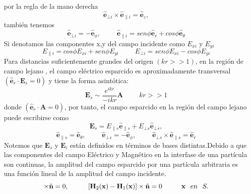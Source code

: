 \documentclass[graybox]{svmult}
\begin{document}
por la regla de la mano derecha
\begin{equation*}
\hat{\textbf{e}}_{\bot i} \times \hat{\textbf{e}}_{\parallel i}=\hat{\textbf{e}}_{z},
\end{equation*}
también tenemos
\begin{equation*}
\hat{\textbf{e}}_{\bot i}=-\hat{\textbf{e}}_{\phi}, \hspace{1cm} \hat{\textbf{e}}_{\parallel i}=sen\phi \hat{\textbf{e}}_{r}+cos\phi \hat{\textbf{e}}_{\theta}
\end{equation*}
Si denotamos las componentes x,y del campo incidente como $E_{xi}$ y $E_{yi}$
\begin{equation*}
E_{\parallel i}=cos\phi E_{xi}+sen\phi E_{yi} \hspace{1cm} E_{\bot i}=sen\phi E_{xi}-cos\phi E_{yi}
\end{equation*}
Para distancias suficientemente grandes del origen $(kr>>1)$, en la región de campo lejano , el campo eléctrico esparcido es aproximadamente transversal $(\hat{\textbf{e}}_{r} \cdot \textbf{E}_{s}=0)$ y tiene la forma asintótica:
\begin{equation*}
\textbf{E}_{s} \sim \frac{e^{ikr}}{-ikr} \textbf{A} \hspace{1cm} kr>>1
\end{equation*}
donde $(\hat{\textbf{e}}_{r} \cdot \textbf{A}=0)$, por tanto, el campo esparcido en la región del campo lejano puede escribirse como
\begin{equation*}
\textbf{E}_{s}=E_{\parallel s}\hat{\textbf{e}}_{\parallel s}+E_{\bot s}\hat{\textbf{e}}_{\bot s},
\end{equation*}
\begin{equation*}
\hat{\textbf{e}}_{\parallel s}=\hat{\textbf{e}}_{\theta}, \hspace{1cm} \hat{\textbf{e}}_{\bot s}=-\hat{\textbf{e}}_{\phi}, \hspace{1cm} \hat{\textbf{e}}_{\bot s} \times \hat{\textbf{e}}_{\parallel s}=\hat{\textbf{e}}_{r}
\end{equation*}
Notemos que $\textbf{E}_{s}$ y $\textbf{E}_{i}$ están definidos en términos de bases distintas.Debido a que las componentes del campo Eléctrico y Magnético en la interfase de una partícula son continuas, la amplitud del campo esparcido por una partícula arbitraria es una función lineal de la amplitud del campo incidente.
\begin{equation*}
[\textbf{E}_{2}(\textbf{x})-\textbf{E}_{1}(\textbf{x})]\times\hat{\textbf{n}}=0, \hspace{1cm} [\textbf{H}_{2}(\textbf{x})-\textbf{H}_{1}(\textbf{x})]\times\hat{\textbf{n}}=0  \hspace{1cm} \textbf{x}\hspace{0.25cm}en\hspace{0.25cm}S.
\end{equation*}
\end{document}
